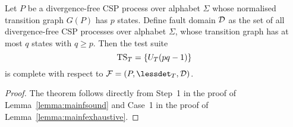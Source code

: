 \begin{theorem}\label{th:tracetest}
Let $P$ be a divergence-free CSP process over alphabet $\Sigma$ whose
normalised transition graph $G(P)$ has $p$ states. Define fault domain ${\cal
D}$ as the set of all divergence-free CSP processes over alphabet $\Sigma$,
whose transition graph has at most $q$ states with $q \ge p$. Then the test
suite
\[
{\text{TS}}_T = \{ U_T(pq-1)   \}
\]
is complete with respect to ${\cal F} = (P,\lessdet_T,{\cal D})$.
\xbox
\end{theorem}
\begin{proof}
The theorem follows directly  
from Step~1 in the proof of Lemma~\ref{lemma:mainfsound} and
Case~1 in the proof of Lemma~\ref{lemma:mainfexhaustive}.
\xbox
\end{proof}
 